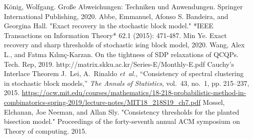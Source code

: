 \documentclass{article}
\begin{document}
\begin{thebibliography}{9}
	 König, Wolfgang. Große Abweichungen: Techniken und Anwendungen. Springer International Publishing, 2020.
	 Abbe, Emmanuel, Afonso S. Bandeira, and Georgina Hall. "Exact recovery in the stochastic block model." *IEEE Transactions on Information Theory* 62.1 (2015): 471-487.
	 	Min Ye.
	\newblock Exact recovery and sharp thresholds of stochastic ising block model,
	2020.
	 Wang, Alex L., and Fatma Kılınç-Karzan. On the tightness of SDP relaxations of QCQPs. Tech. Rep, 2019.
	 http://matrix.skku.ac.kr/Series-E/Monthly-E.pdf Cauchy’s Interlace Theorem
	J.~Lei, A.~Rinaldo \emph{et~al.}, ``Consistency of spectral clustering in
	stochastic block models,'' \emph{The Annals of Statistics}, vol.~43, no.~1,
	pp. 215--237, 2015.
	 \url{https://ocw.mit.edu/courses/mathematics/18-218-probabilistic-method-in-combinatorics-spring-2019/lecture-notes/MIT18_218S19_ch7.pdf}
	 Mossel, Elchanan, Joe Neeman, and Allan Sly. "Consistency thresholds for the planted bisection model." Proceedings of the forty-seventh annual ACM symposium on Theory of computing. 2015.
\end{thebibliography}
\end{document}

